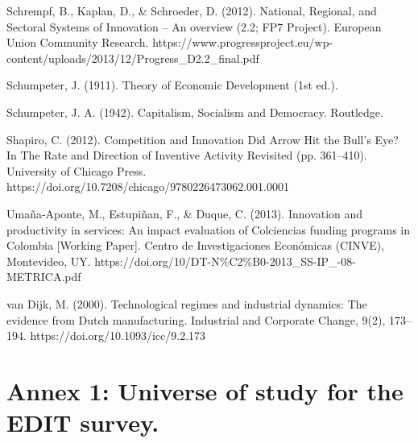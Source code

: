 \documentclass[12pt,a4paper]{article}
\begin{document}
{Schrempf, B., Kaplan, D., \& Schroeder, D. (2012). National, Regional, and Sectoral Systems of Innovation –   An overview (2.2; FP7 Project). European Union Community Research. https://www.progressproject.eu/wp-content/uploads/2013/12/Progress\_D2.2\_final.pdf


Schumpeter, J. (1911). Theory of Economic Development (1st ed.).

Schumpeter, J. A. (1942). Capitalism, Socialism and Democracy. Routledge.

Shapiro, C. (2012). Competition and Innovation Did Arrow Hit the Bull’s Eye? In The Rate and Direction of Inventive Activity Revisited (pp. 361–410). University of Chicago Press. https://doi.org/10.7208/chicago/9780226473062.001.0001

Umaña-Aponte, M., Estupiñan, F., \& Duque, C. (2013). Innovation and productivity in services: An impact evaluation of Colciencias funding programs in Colombia [Working Paper]. Centro de Investigaciones Económicas (CINVE), Montevideo, UY. https://doi.org/10/DT-N\%C2\%B0-2013\_SS-IP\_-08-METRICA.pdf

van Dijk, M. (2000). Technological regimes and industrial dynamics: The evidence from Dutch manufacturing. Industrial and Corporate Change, 9(2), 173–194. https://doi.org/10.1093/icc/9.2.173






\pagebreak
\appendix
\section{Annex 1: Universe of study for the EDIT survey.}

}
\end{document}
